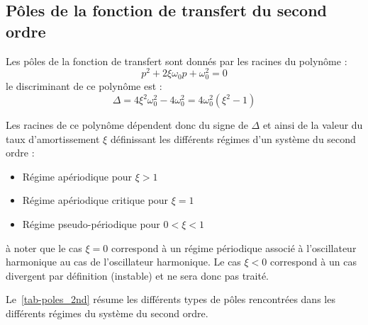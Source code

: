 \subsection{Pôles de la fonction de transfert du second ordre}
Les pôles de la fonction de transfert sont donnés par les racines du polynôme :
$$
p^2+2\xi\omega_0p+\omega_0^2 = 0
$$
le discriminant de ce polynôme est :
$$
\Delta=4\xi^2\omega^2_0-4\omega_0^2=4\omega_0^2(\xi^2-1)
$$

Les racines de ce polynôme dépendent donc du signe de $\Delta$ 
et ainsi de la valeur du taux d'amortissement $\xi$ définissant les 
différents régimes d'un système du second ordre :
\begin{itemize}
    \item Régime apériodique pour $\xi>1$
    \item Régime apériodique critique pour $\xi=1$
    \item Régime pseudo-périodique pour $0<\xi<1$
\end{itemize}
à noter que le cas $\xi=0$ correspond à un régime périodique associé à 
l'oscillateur harmonique au cas de l'oscillateur harmonique.
Le cas $\xi<0$ correspond à un cas divergent par définition (instable) et 
ne sera donc pas traité.

Le~\cref{tab-poles_2nd} résume les différents types de pôles rencontrées dans 
les différents régimes du système du second ordre.

